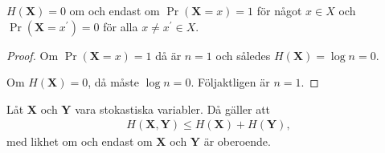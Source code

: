\documentclass{beamer}
\let\stoch\mathbf{}
\begin{document}
\begin{frame}
  \begin{corollary}
    \(H(\stoch X) = 0\) om och endast om \(\Pr(\stoch X = x) = 1\) för något 
    \(x\in X\) och \(\Pr(\stoch X = x^\prime) = 0\) för alla \(x\neq x^\prime 
    \in X\).
  \end{corollary}

  \begin{proof}
    Om \(\Pr(\stoch X = x) = 1\) då är \(n = 1\) och således \(H(\stoch X) 
    = \log n = 0\).

    Om \(H(\stoch X) = 0\), då måste \(\log n = 0\).
    Följaktligen är \(n = 1\).
  \end{proof}
\end{frame}

%
%

\begin{frame}
  \begin{lemma}
    Låt \(\stoch X\) och \(\stoch Y\) vara stokastiska variabler.
    Då gäller att
    \begin{align*}
      H(\stoch X, \stoch Y)\leq H(\stoch X) + H(\stoch Y),
    \end{align*}
    med likhet om och endast om \(\stoch X\) och \(\stoch Y\) är oberoende.
  \end{lemma}
\end{frame}

%
%
\end{document}
